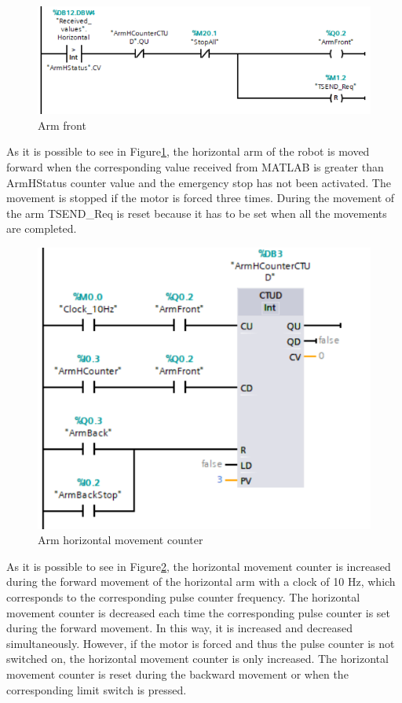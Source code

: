 \begin{figure}[!h]
\begin{center}
\includegraphics[width=0.6\linewidth]{capitolo3/figure/Segmento1_3_AF.PNG}
\caption{Arm front}
\label{fig:arm_front}
\end{center}
\end{figure}

As it is possible  to see in Figure\ref{fig:arm_front}, the horizontal arm of the robot is moved forward when the corresponding value received from MATLAB is greater than ArmHStatus counter value and the emergency stop has not been activated. The movement is stopped if the motor is forced three times. During the movement of the arm TSEND\_Req is reset because it has to be set when all the movements are completed.

\begin{figure}[!h]
\begin{center}
\includegraphics[width=0.6\linewidth]{capitolo3/figure/Segmento1_10.PNG}
\caption{Arm horizontal movement counter}
\label{fig:arm_h_counter}
\end{center}
\end{figure}

As it is possible  to see in Figure\ref{fig:arm_h_counter}, the horizontal movement counter is increased during the forward movement of the horizontal arm with a clock of 10 Hz, which corresponds to the corresponding pulse counter frequency. The horizontal  movement counter is decreased each time the corresponding pulse counter is set during the forward movement. In this way, it is increased and decreased simultaneously. However, if the motor is forced and thus the pulse counter is not switched on, the horizontal movement counter is only increased. The horizontal movement counter is reset during the backward movement or when the corresponding limit switch is pressed.

